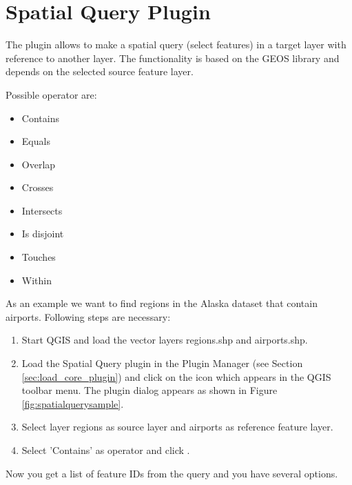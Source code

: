 
\section{Spatial Query Plugin}\label{sec:spatial_query}


The  plugin allows to make a spatial 
query (select features) in a target layer with reference to another layer. The 
functionality is based on the GEOS library and depends on the selected source 
feature layer. 

Possible operator are:

\begin{itemize}[label=--]
\item Contains
\item Equals
\item Overlap
\item Crosses
\item Intersects
\item Is disjoint
\item Touches
\item Within
\end{itemize}


As an example we want to find regions in the Alaska dataset that contain 
airports. Following steps are necessary:

\begin{enumerate}
  \item Start QGIS and load the vector layers regions.shp and airports.shp. 
  \item Load the Spatial Query plugin in the Plugin Manager (see Section 
  \ref{sec:load_core_plugin}) and click on the     
  icon which appears in the QGIS toolbar menu. The plugin dialog appears as shown 
  in Figure \ref{fig:spatialquerysample}.
  \item Select layer regions as source layer and airports as reference feature layer.
  \item Select 'Contains' as operator and click .
\end{enumerate}

Now you get a list of feature IDs from the query and you have several options.

